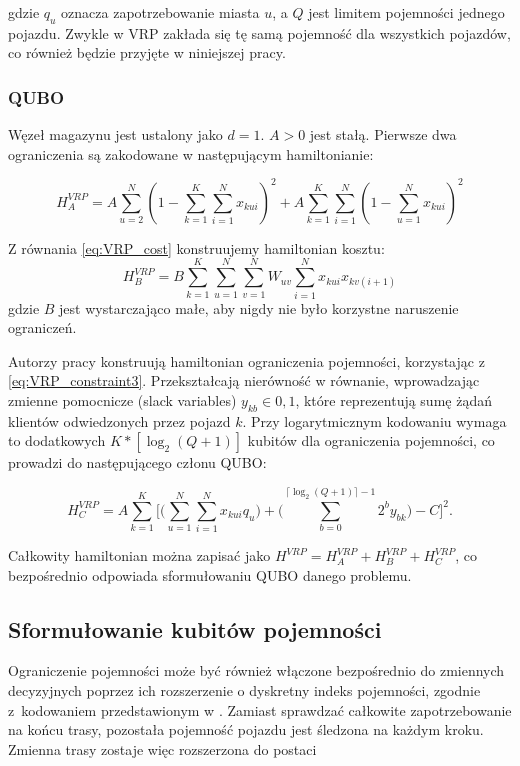 gdzie $q_u$ oznacza zapotrzebowanie miasta $u$, a $Q$ jest limitem pojemności jednego pojazdu. Zwykle w VRP zakłada się tę samą pojemność dla wszystkich pojazdów, co również będzie przyjęte w niniejszej pracy.

\subsubsection*{QUBO}
Węzeł magazynu jest ustalony jako $d=1$. $A > 0$ jest stałą.
Pierwsze dwa ograniczenia są zakodowane w następującym hamiltonianie:

\begin{equation}
H_A^{VRP} = A \sum_{u=2}^N (1 - \sum_{k=1}^K \sum_{i=1}^{N} x_{kui})^2 + A \sum_{k=1}^K \sum_{i=1}^{N} (1 - \sum_{u=1}^N x_{kui})^2
\end{equation}

Z równania \ref{eq:VRP_cost} konstruujemy hamiltonian kosztu:
\begin{equation}
H_B^{VRP} = B \sum_{k=1}^K \sum_{u=1}^N \sum_{v=1}^N W_{uv} \sum_{i=1}^N x_{kui} x_{kv(i+1)}
\end{equation}
gdzie $B$ jest wystarczająco małe, aby nigdy nie było korzystne naruszenie ograniczeń.

Autorzy pracy \cite{Palackal_2023} konstruują hamiltonian ograniczenia pojemności, korzystając z \ref{eq:VRP_constraint3}. Przekształcają nierówność w równanie, wprowadzając zmienne pomocnicze (slack variables) $y_{kb} \in {0, 1}$, które reprezentują sumę żądań klientów odwiedzonych przez pojazd $k$. Przy logarytmicznym kodowaniu wymaga to dodatkowych $K * [\log_2(Q + 1)]$ kubitów dla ograniczenia pojemności, co prowadzi do następującego członu QUBO:

\begin{equation}
H_{C}^{VRP} = A\sum_{k=1}^{K} \Big[ \Big(\sum_{u=1}^{N} \sum_{i=1}^{N} x_{kui} q_u\Big) + \Big(\sum_{b=0}^{\lceil \log_2(Q+1) \rceil - 1} 2^b y_{bk}\Big) - C \Big]^2 .
\end{equation}

Całkowity hamiltonian można zapisać jako
$H^{VRP} = H_A^{VRP} + H_B^{VRP} + H_C^{VRP}$,
co bezpośrednio odpowiada sformułowaniu QUBO danego problemu.

\subsection{Sformułowanie kubitów pojemności}
Ograniczenie pojemności może być również włączone bezpośrednio do zmiennych decyzyjnych poprzez ich rozszerzenie o dyskretny indeks pojemności, zgodnie z~kodowaniem przedstawionym w \cite{irie2019quantumannealingvehiclerouting}.
Zamiast sprawdzać całkowite zapotrzebowanie na końcu trasy, pozostała pojemność pojazdu jest śledzona na każdym kroku. Zmienna trasy zostaje więc rozszerzona do postaci

